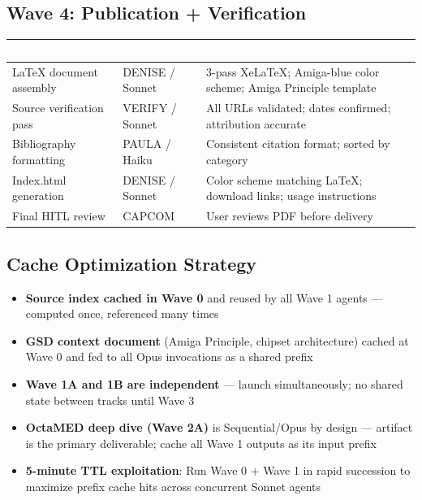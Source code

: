 \documentclass[11pt,letterpaper]{article}
\newcommand{\tableheader}[1]{\textbf{\sffamily\textcolor{white}{#1}}}
\begin{document}
\subsection{Wave 4: Publication + Verification}

\begin{center}
\begin{tabularx}{\textwidth}{L{4cm}L{2.5cm}X}
\toprule
{}
\tableheader{Task} & \tableheader{Agent} & \tableheader{Notes} \\
\midrule
LaTeX document assembly & DENISE / Sonnet & 3-pass XeLaTeX; Amiga-blue color scheme; Amiga Principle template \\
Source verification pass & VERIFY / Sonnet & All URLs validated; dates confirmed; attribution accurate \\
Bibliography formatting & PAULA / Haiku & Consistent citation format; sorted by category \\
Index.html generation & DENISE / Sonnet & Color scheme matching LaTeX; download links; usage instructions \\
Final HITL review & CAPCOM & User reviews PDF before delivery \\
\bottomrule
\end{tabularx}
\end{center}

\subsection{Cache Optimization Strategy}

\begin{itemize}[leftmargin=1.5em]
  \item \textbf{Source index cached in Wave 0} and reused by all Wave 1 agents --- computed once, referenced many times
  \item \textbf{GSD context document} (Amiga Principle, chipset architecture) cached at Wave 0 and fed to all Opus invocations as a shared prefix
  \item \textbf{Wave 1A and 1B are independent} --- launch simultaneously; no shared state between tracks until Wave 3
  \item \textbf{OctaMED deep dive (Wave 2A)} is Sequential/Opus by design --- artifact is the primary deliverable; cache all Wave 1 outputs as its input prefix
  \item \textbf{5-minute TTL exploitation}: Run Wave 0 + Wave 1 in rapid succession to maximize prefix cache hits across concurrent Sonnet agents
\end{itemize}
\end{document}
